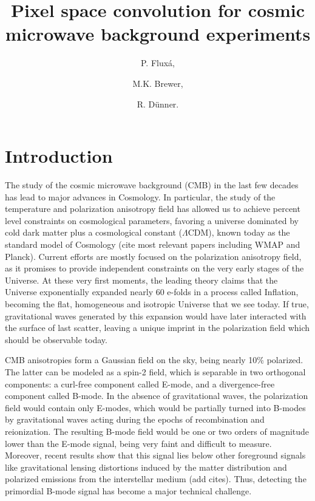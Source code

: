\documentclass[a4paper,11pt]{article}
\title{\boldmath Pixel space convolution for cosmic microwave background experiments}
\author[a]{P. Flux\'a, }
\author[b]{M.K. Brewer, }
\author[a]{R. D\"unner.}
\affiliation[a]{Instituto de Astrof\'isica, Pontificia Universidad Cat\'olica de Chile ,\\Vicu\~na Mackenna 4860, Chile}
\affiliation[b]{Department of Astronomy, Johns Hopkins University,\\Baltimore MD, USA}
\begin{document}
\maketitle
\flushbottom


\section{Introduction}

The study of the cosmic microwave background (CMB) in the last few decades has lead to major advances in Cosmology. In particular, the study of the temperature and polarization anisotropy field has allowed us to achieve percent level constraints on cosmological parameters, favoring a universe dominated by cold dark matter plus a cosmological constant ($\Lambda$CDM), known today as the standard model of Cosmology {\color{red} (cite most relevant papers including WMAP and Planck)}. Current efforts are mostly focused on the polarization anisotropy field, as it promises to provide independent constraints on the very early stages of the Universe. At these very first moments, the leading theory claims that the Universe exponentially expanded nearly 60 e-folds in a process called Inflation, becoming the flat, homogeneous and isotropic Universe that we see today. If true, gravitational waves generated by this expansion would have later interacted with the surface of last scatter, leaving a unique imprint in the polarization field which should be observable today.

CMB anisotropies form a Gaussian field on the sky, being nearly 10\% polarized. The latter can be modeled as a spin-2 field, which is separable in two orthogonal components: a curl-free component called E-mode, and a divergence-free component called B-mode. In the absence of gravitational waves, the polarization field would contain only E-modes, which would be partially turned into B-modes by gravitational waves acting during the epochs of recombination and reionization. The resulting B-mode field would be one or two orders of magnitude lower than the E-mode signal, being very faint and difficult to measure. Moreover, recent results show that this signal lies below other foreground signals like gravitational lensing distortions induced by the matter distribution and polarized emissions from the interstellar medium {\color{red}(add cites)}. Thus, detecting the primordial B-mode signal has become a major technical challenge.
\end{document}
